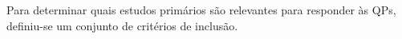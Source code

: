 
Para determinar quais estudos primários são relevantes para responder às QPs, definiu-se um conjunto de critérios de inclusão.

